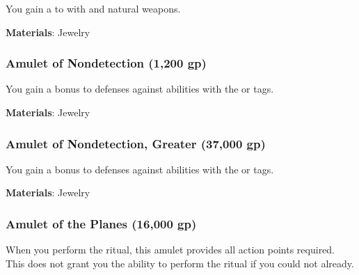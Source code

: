 You gain a   to  with  and natural weapons.



\vspace{0.25em}
\textbf{Materials}: Jewelry


\lowercase{\hypertarget{item:Amulet of Nondetection}{}}\label{item:Amulet of Nondetection}
\hypertarget{item:Amulet of Nondetection}{\subsubsection{Amulet of Nondetection\hfill{} (1,200 gp)}}

You gain a  bonus to defenses against abilities with the  or  tags.



\vspace{0.25em}
\textbf{Materials}: Jewelry


\lowercase{\hypertarget{item:Amulet of Nondetection, Greater}{}}\label{item:Amulet of Nondetection, Greater}
\hypertarget{item:Amulet of Nondetection, Greater}{\subsubsection{Amulet of Nondetection, Greater\hfill{} (37,000 gp)}}

You gain a  bonus to defenses against abilities with the  or  tags.



\vspace{0.25em}
\textbf{Materials}: Jewelry


\lowercase{\hypertarget{item:Amulet of the Planes}{}}\label{item:Amulet of the Planes}
\hypertarget{item:Amulet of the Planes}{\subsubsection{Amulet of the Planes\hfill{} (16,000 gp)}}

When you perform the  ritual, this amulet provides all action points required.
This does not grant you the ability to perform the  ritual if you could not already.



